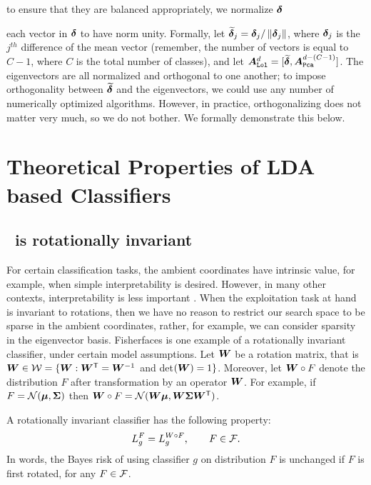 \documentclass[10pt]{article}
\begin{document}
to ensure that they are balanced appropriately, we normalize $\boldsymbol{\delta}$

each vector in $\boldsymbol{\delta}$ to have norm unity.  Formally, let $\widetilde{\boldsymbol{\delta}}_j = \boldsymbol{\delta}_j / \left \lVert\boldsymbol{\delta}_j \right \rVert$, where $\boldsymbol{\delta}_j$ is the $j^{th}$ difference of the mean vector (remember, the number of vectors is equal to $C-1$, where $C$ is the total number of classes), and let  $\boldsymbol{A}_{{\sc \texttt{Lol}}}^d=[\widetilde{\boldsymbol{\delta}}, \boldsymbol{A}_{{\sc \texttt{Pca}}}^{d-(C-1)}]$.
The eigenvectors are all normalized and orthogonal to one another; to impose orthogonality between $\widetilde{\boldsymbol{\delta}}$ and the eigenvectors, we could use any number of numerically optimized algorithms.  However, in practice, orthogonalizing does not matter very much, so we do not bother. We formally demonstrate this below.




\section[LDA]{Theoretical Properties of LDA based Classifiers}


\subsection{\Lda~is rotationally invariant}

For certain classification tasks, the ambient coordinates have intrinsic value, for example, when simple interpretability is desired.  However, in many other contexts, interpretability is less important \cite{Breiman2001b}.  When the exploitation task at hand is invariant to rotations, then we have no reason to restrict our search space to be sparse in the ambient coordinates, rather, for example, we can consider sparsity in the eigenvector basis.  Fisherfaces is one example of a rotationally invariant classifier, under certain model assumptions.
Let  $\boldsymbol{W}$ be a rotation matrix, that is $\boldsymbol{W} \in \mathcal{W}=\{\boldsymbol{W} : \boldsymbol{W}^{\mathsf{T}} = \boldsymbol{W}^{-1}$ and det$(\boldsymbol{W})=1\}$.
Moreover, let $\boldsymbol{W} \circ F$ denote the distribution $F$ after transformation by an operator $\boldsymbol{W}$.  For example, if $F=\mathcal{N}(\boldsymbol{\mu},\boldsymbol{\Sigma})$ then $\boldsymbol{W} \circ F=\mathcal{N}(\boldsymbol{W}  \boldsymbol{\mu}, \boldsymbol{W} \boldsymbol{\Sigma} \boldsymbol{W}^{\mathsf{T}})$.

\begin{defi}
A rotationally invariant classifier has the following property:
$$L_g^F = L_g^{W \circ F}, \qquad F \in \mathcal{F}.$$
In words, the Bayes risk of using classifier $g$ on distribution $F$ is unchanged if $F$ is first rotated, for any $F \in \mathcal{F}$.
\end{defi}
\end{document}
